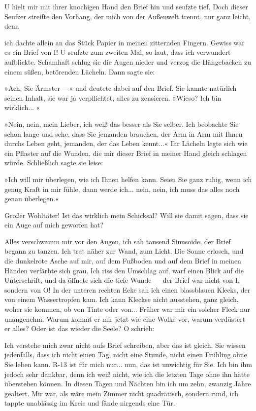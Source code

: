 U hielt mir mit ihrer knochigen Hand den Brief hin und seufzte
tief. Doch dieser Seufzer streifte den Vorhang, der mich von der
Außenwelt trennt, nur ganz leicht, denn

ich dachte allein an das Stück Papier in meinen zitternden Fingern.
Gewiss war es ein Brief von I! U seufzte zum zweiten Mal, so laut,
dass ich verwundert aufblickte. Schamhaft schlug sie die Augen
nieder und verzog die Hängebacken zu einem süßen, betörenden
Lächeln. Dann sagte sie:

»Ach, Sie Ärmster —« und deutete dabei auf den Brief. Sie kannte
natürlich seinen Inhalt, sie war ja verpflichtet, alles zu
zensieren. »Wieso? Ich bin wirklich... «

»Nein, nein, mein Lieber, ich weiß das besser als Sie selber. Ich
beobachte Sie schon lange und sehe, dass Sie jemanden brauchen, der
Arm in Arm mit Ihnen durchs Leben geht, jemanden, der das Leben
kennt...« Ihr Lächeln legte sich wie ein Pflaster auf die Wunden,
die mir dieser Brief in meiner Hand gleich schlagen würde.
Schließlich sagte sie leise:

»Ich will mir überlegen, wie ich Ihnen helfen kann. Seien Sie ganz
ruhig, wenn ich genug Kraft in mir fühle, dann werde ich... nein,
nein, ich muss das alles noch genau überlegen.«

Großer Wohltäter! Ist das wirklich mein Schicksal? Will sie damit
sagen, dass sie ein Auge auf mich geworfen hat?

Alles verschwamm mir vor den Augen, ich sah tausend Sinusoide, der
Brief begann zu tanzen. Ich trat näher zur Wand, zum Licht. Die
Sonne erlosch, und die dunkelrote Asche auf mir, auf dem Fußboden
und auf dem Brief in meinen Händen verfärbte sich grau. Ich riss
den Umschlag auf, warf einen Blick auf die Unterschrift, und da
öffnete sich die tiefe Wunde — der Brief war nicht von I, sondern
von O! In der unteren rechten Ecke sah ich einen blassblauen
Klecks, der von einem Wassertropfen kam. Ich kann Kleckse nicht
ausstehen, ganz gleich, woher sie kommen, ob von Tinte oder von...
Früher war mir ein solcher Fleck nur unangenehm. Warum kommt er mir
jetzt wie eine Wolke vor, warum verdüstert er alles? Oder ist das
wieder die Seele? O schrieb:

Ich verstehe mich zwar nicht aufs Brief schreiben, aber das ist
gleich. Sie wissen jedenfalls, dass ich nicht einen Tag, nicht eine
Stunde, nicht einen Frühling ohne Sie leben kann. R-13 ist für mich
nur... nun, das ist unwichtig für Sie. Ich bin ihm jedoch sehr
dankbar, denn ich weiß nicht, wie ich die letzten Tage ohne ihn
hätte überstehen können. In diesen Tagen und Nächten bin ich um
zehn, zwanzig Jahre gealtert. Mir war, als wäre mein Zimmer nicht
quadratisch, sondern rund, ich tappte unablässig im Kreis und fände
nirgends eine Tür.

